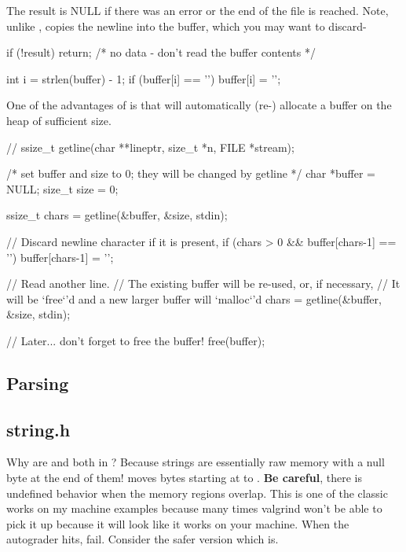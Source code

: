 The result is NULL if there was an error or the end of the file is
reached. Note, unlike ,  copies the newline
into the buffer, which you may want to discard-

\begin{code}[language=C]
if (!result) { return; /* no data - don't read the buffer contents */}

int i = strlen(buffer) - 1;
if (buffer[i] == '\n') 
    buffer[i] = '\0';
\end{code}

One of the advantages of  is that will automatically
(re-) allocate a buffer on the heap of sufficient size.

\begin{code}[language=C]
// ssize_t getline(char **lineptr, size_t *n, FILE *stream);

 /* set buffer and size to 0; they will be changed by getline */
char *buffer = NULL;
size_t size = 0;

ssize_t chars = getline(&buffer, &size, stdin);

// Discard newline character if it is present,
if (chars > 0 && buffer[chars-1] == '\n') 
    buffer[chars-1] = '\0';

// Read another line.
// The existing buffer will be re-used, or, if necessary,
// It will be `free`'d and a new larger buffer will `malloc`'d
chars = getline(&buffer, &size, stdin);

// Later... don't forget to free the buffer!
free(buffer);
\end{code}

\subsection{Parsing}

\subsection{string.h}

Why are  and  both in ? Because strings are essentially raw memory with a null byte at the end of them!  moves  bytes starting at  to . \textbf{Be careful}, there is undefined behavior when the memory regions overlap. This is one of the classic works on my machine examples because many times valgrind won't be able to pick it up because it will look like it works on your machine. When the autograder hits, fail. Consider the safer version which is.

